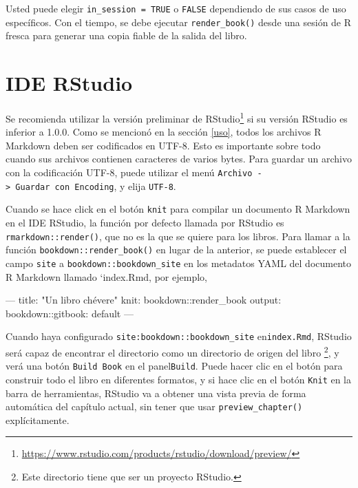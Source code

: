 \documentclass[12pt,]{krantz}
\makeatletter
\newenvironment{Shaded}{\begin{snugshade}}{\end{snugshade}}
\newcommand{\StringTok}[1]{\textcolor[rgb]{0.31,0.60,0.02}{{#1}}}
\newcommand{\OtherTok}[1]{\textcolor[rgb]{0.56,0.35,0.01}{{#1}}}
\newcommand{\FunctionTok}[1]{\textcolor[rgb]{0.00,0.00,0.00}{{#1}}}
\newcommand{\NormalTok}[1]{{#1}}
\renewcommand{\href}[2]{#2\footnote{\url{#1}}}
\newenvironment{kframe}{%
\medskip{}
\setlength{\fboxsep}{.8em}
 \def\at@end@of@kframe{}%
 \ifinner\ifhmode%
  \def\at@end@of@kframe{\end{minipage}}%
  \begin{minipage}{\columnwidth}%
 \fi\fi%
 \def\FrameCommand##1{\hskip\@totalleftmargin \hskip-\fboxsep
 \colorbox{shadecolor}{##1}\hskip-\fboxsep
     \hskip-\linewidth \hskip-\@totalleftmargin \hskip\columnwidth}%
 \MakeFramed {\advance\hsize-\width
   \@totalleftmargin\z@ \linewidth\hsize
   \@setminipage}}%
 {\par\unskip\endMakeFramed%
 \at@end@of@kframe}
\renewenvironment{Shaded}{\begin{kframe}}{\end{kframe}}
\theoremstyle{definition}
\theoremstyle{definition}
\theoremstyle{remark}
\makeatother
\begin{document}
Usted puede elegir \texttt{in\_session\ =\ TRUE} o \texttt{FALSE}
dependiendo de sus casos de uso específicos. Con el tiempo, se debe
ejecutar \texttt{render\_book()} desde una sesión de R fresca para
generar una copia fiable de la salida del libro.

\section{IDE RStudio}\label{ide-rstudio}

Se recomienda utilizar
\href{https://www.rstudio.com/products/rstudio/download/preview/}{la
versión preliminar de RStudio} si su versión RStudio
es inferior a 1.0.0. Como se mencionó en la sección \ref{uso}, todos los
archivos R Markdown deben ser codificados en UTF-8. Esto es importante
sobre todo cuando sus archivos contienen caracteres de varios bytes.
Para guardar un archivo con la codificación UTF-8, puede utilizar el
menú \texttt{Archivo\ -\textgreater{}\ Guardar\ con\ Encoding}, y elija
\texttt{UTF-8}.

Cuando se hace click en el botón \texttt{knit} para compilar un
documento R Markdown en el IDE RStudio, la función por defecto llamada
por RStudio es \texttt{rmarkdown::render()}, que no es la que se quiere
para los libros. Para llamar a la función
\texttt{bookdown::render\_book()} en lugar de la anterior, se puede
establecer el campo \texttt{site} a \texttt{bookdown::bookdown\_site} en
los metadatos YAML del documento R Markdown llamado `index.Rmd, por
ejemplo,

\begin{Shaded}
\begin{Highlighting}[]
\OtherTok{---}
\FunctionTok{title:} \StringTok{"Un libro chévere"}
\FunctionTok{knit:} \NormalTok{bookdown::render_book}
\FunctionTok{output:}
  \FunctionTok{bookdown:}\NormalTok{:gitbook: default}
\OtherTok{---}
\end{Highlighting}
\end{Shaded}

Cuando haya configurado \texttt{site:bookdown::bookdown\_site}
en\texttt{index.Rmd}, RStudio será capaz de encontrar el directorio como
un directorio de origen del libro \footnote{Este directorio tiene que
  ser un proyecto RStudio.}, y verá una botón \texttt{Build\ Book} en el
panel\texttt{Build}. Puede hacer clic en el botón para construir todo el
libro en diferentes formatos, y si hace clic en el botón \texttt{Knit}
en la barra de herramientas, RStudio va a obtener una vista previa de
forma automática del capítulo actual, sin tener que usar
\texttt{preview\_chapter()} explícitamente.
\end{document}

